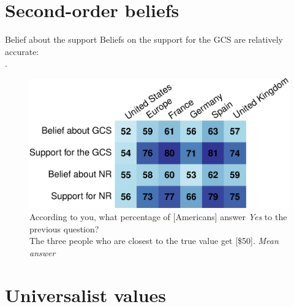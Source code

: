 \documentclass[aspectratio=169,xcolor=dvipsnames, 11pt,mathserif]{beamer}
\begin{document}
\begin{framefont}{\small}
\section{Second-order beliefs}

\begin{frame}{Belief about the support\label{}}
	\bbvs \ip Beliefs on the support for the GCS are relatively accurate: \\ \quad {}.
    \ee \vspace*{-.4cm}
    \begin{figure}
        \centering 
        \caption{According to you, what percentage of [Americans] answer \textit{Yes} to the previous question? \\ The three people who are closest to the true value get [\$50].  \textit{Mean answer}
        }
        \vspace{-.2cm}
        \includegraphics[height=.6\textheight]{../figures/country_comparison/belief_all_mean.pdf} 
    \end{figure}
\end{frame}

\section{Universalist values}


\end{framefont}
\end{document}
